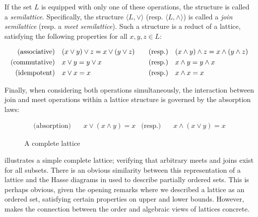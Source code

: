 If the set $L$ is equipped with only one of these operations, the structure is called a \textit{semilattice}. Specifically, the structure $\langle L, \vee \rangle$ (resp. $\langle L, \wedge \rangle$) is called a \textit{join semilattice} (resp. a \textit{meet semilattice}). Such a structure is a reduct of a lattice, satisfying the following properties for all $x, y, z \in L$:

\vspace{-1em}
\begin{align}
     \text{(associative)} & \quad (x \vee y) \vee z = x \vee (y \vee z) & \quad \text{(resp.)} & \quad (x \wedge y) \wedge z = x \wedge (y \wedge z) \\ \index{Boolean operator! associativity} 
  \text{(commutative)} & \quad x \vee y = y \vee x & \text{(resp.)}  & \quad x \wedge y = y \wedge x \\ \index{Boolean operator! commutativity}
  \text{(idempotent)}  & \quad x \vee x = x & \text{(resp.)}  & \quad x \wedge x = x \index{Boolean operator! idempotency}
\end{align}

Finally, when considering both operations simultaneously, the interaction between join and meet operations within a lattice structure is governed by the absorption laws:

\vspace{-1em}
\begin{align}
  \text{(absorption)} & \quad x \vee (x \wedge y) = x & \text{(resp.)}  & \quad x \wedge (x \vee y) = x
\end{align}

\begin{figure}[H]
  \centering
  \caption{A complete lattice}
  \label{figure:complete-lattice}
\end{figure}

 illustrates a simple complete lattice; verifying that arbitrary meets and joins exist for all subsets. There is an obvious similarity between this representation of a lattice and the Hasse diagrams in  used to describe partially ordered sets. This is perhaps obvious, given the opening remarks where we described a lattice as an ordered set, satisfying certain properties on upper and lower bounds. However,  makes the connection between the order and algebraic views of lattices concrete.

